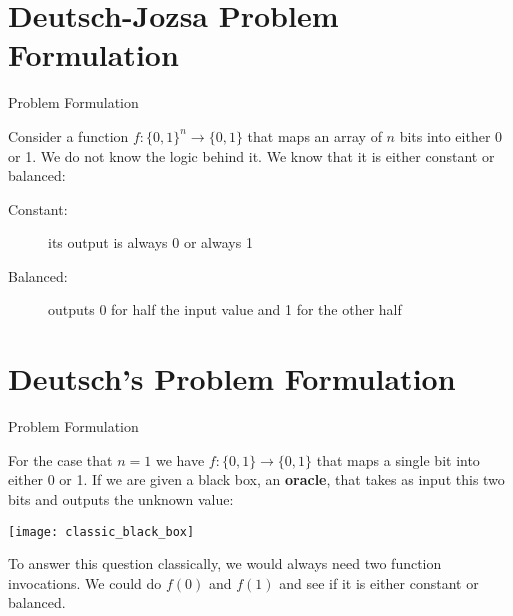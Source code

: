 \documentclass[aspectratio=43]{beamer}
\begin{document}
\section{Deutsch-Jozsa Problem Formulation}
\begin{frame}{\djs Problem Formulation}
\begin{card}
    Consider a function $f: \{0,1\}^n \rightarrow \{0,1\}$ that maps an array of $n$  bits into either 0 or 1. We do not know the logic behind it. We know that it is either constant or balanced:
    \begin{description}
        \item[Constant:] its output is always 0 or always 1
        \item[Balanced:] outputs 0 for half the input value and 1 for the other half
    \end{description}
\end{card}
\pagenumber
\end{frame}

\section{Deutsch's Problem Formulation}
\begin{frame}{\ds Problem Formulation}
\begin{card}
    For the case that $n=1$ we have $f: \{0,1\} \rightarrow \{0,1\}$ that maps a single bit into either 0 or 1. If we are given a black box, an \textbf{oracle}, that takes as input this two bits and outputs the unknown value:
    \begin{center}
        \texttt{[image: classic\_black\_box]}
    \end{center}
\end{card}
\begin{cardTiny}
    To answer this question classically, we would always need two function invocations. We could do $f(0)$ and $f(1)$ and see if it is either constant or balanced. 
\end{cardTiny}
\pagenumber
\end{frame}
\end{document}
